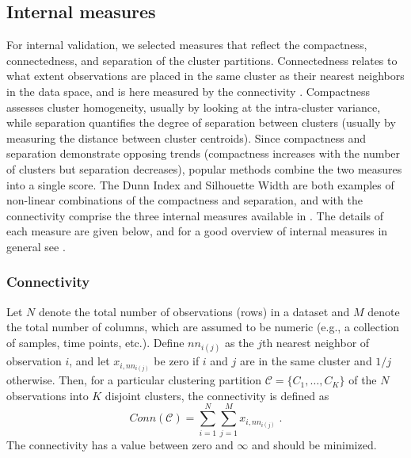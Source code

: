\documentclass[11pt]{article}
\begin{document}
\subsection{Internal measures}
\label{subsec:internal}


For internal validation, we selected measures that reflect the
compactness, connectedness, and separation of the cluster
partitions.  Connectedness relates to what extent observations are placed in the same
cluster as their nearest neighbors in the data space, and is here measured
by the connectivity \citep{Han2005}.  Compactness assesses cluster homogeneity, usually by
looking at the intra-cluster variance, while separation quantifies the
degree of separation between clusters (usually by measuring the
distance between cluster centroids).  Since compactness and separation
demonstrate opposing trends (compactness increases with the number of
clusters but separation decreases), popular methods combine the two
measures into a single score.  The Dunn Index \citep{Dun1974} and Silhouette
Width \citep{Rou1987} are
both examples of non-linear combinations of the compactness and
separation, 
and with the connectivity comprise the three internal measures
available in .  The details of each measure are given
below, and for a good overview of internal measures in general see \citet{Han2005}.

\subsubsection*{Connectivity}

Let $N$ denote the total number of observations (rows) in a dataset
and $M$ denote the total number of columns, which are assumed to be
numeric (e.g., a collection of samples, time points, etc.).
Define $nn_{i(j)}$ as the $j$th nearest neighbor of observation $i$, and
let $x_{i,nn_{i(j)}}$ be zero if $i$ and $j$ are in the same cluster and
$1/j$ otherwise.  Then, for a particular clustering partition
$\mathcal{C} = \{C_1, \ldots, C_K\}$ of the $N$ observations into $K$
disjoint clusters, the connectivity is defined as 
$$
Conn(\mathcal{C}) = \sum\limits_{i=1}^N\sum\limits_{j=1}^M x_{i,nn_{i(j)}} \;.
$$
The connectivity has a value between zero and $\infty$ and should be minimized.
\end{document}

